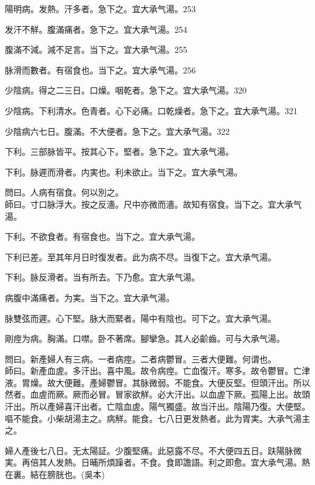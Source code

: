 \documentclass[12pt,twoside,UTF8,b5paper]{ctexbook}
\begin{document}
陽明病。发熱。汗多者。急下之。宜{大}承气湯。253

发汗不觧。腹滿痛者。急下之。宜{大}承气湯。254

腹滿不減。減不足言。当下之。宜{大}承气湯。255

脉滑而數者。有宿食也。当下之。宜{大}承气湯。256

少陰病。得之二三日。口燥。咽乾者。急下之。宜{大}承气湯。320

少陰病。{下}利清水。色青者。心下必痛。口乾燥者。急下之。宜{大}承气湯。321

少陰病六七日。腹滿。不大便者。急下之。宜{大}承气湯。322

下利。三部脉皆平。按其心下。堅者。急下之。宜{大}承气湯。

下利。脉遲而滑者。{内}実也。利未欲止。当下之。宜{大}承气湯。

問曰。人病有宿食。何以別之。\\
師曰。寸口脉浮大。按之反濇。尺中亦微而濇。故知有宿食。当下之。宜{大}承气湯。

下利。不欲食者。有宿食也。当下之。宜{大}承气湯。

下利{已}差。至其{年月日}时復发者。此为病不尽。当復下之。宜{大}承气湯。

下利。脉反滑者。当有所去。下乃愈。宜大承气湯。

病腹中滿痛者。为実。当下之。宜大承气湯。

脉雙弦而遲。心下堅。脉大而緊者。陽中有陰也。可下之。宜{大}承气湯。

{剛}痙为病。胸滿。口噤。卧不著席。腳攣急。其人必齘齒。可与大承气湯。

問曰。新產婦人有三病。一者病痙。二者病鬱冒。三者大便難。何谓也。\\
師曰。新產血虗。多汗出。喜中風。故令病痙。亡血復汗。寒多。故令鬱冒。亡津液。胃燥。故大便難。產婦鬱冒。其脉微弱。不能食。大便反堅。但頭汗出。所以然者。血虗而厥。厥而必冒。冒家欲觧。必大汗出。以血虗下厥。孤陽上出。故頭汗出。所以產婦喜汗出者。亡陰血虗。陽气獨盛。故当汗出。陰陽乃復。大便堅。嘔不能食。小柴胡湯主之。病觧。能食。七八日更发熱者。此为胃実。大承气湯主之。

婦人產後七八日。无太陽証。少腹堅痛。此惡露不尽。不大便四五日。趺陽脉微実。再倍其人发熱。日晡所煩躁者。不食。食即譫語。利之即愈。宜大承气湯。熱在裏。結在膀胱也。(吳本)
\end{document}
